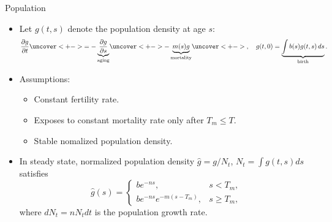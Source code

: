 \documentclass[11pt, aspectratio=169]{beamer}
\begin{document}
\begin{frame}[label=population]{Population}
    \begin{itemize}[<+->]
        \item Let $g(t,s)$ denote the population density at age $s$:
        \begin{equation*}
            \frac{\partial g}{\partial t}
            \uncover<+->{=-\underbrace{\frac{\partial g}{\partial s}}_{\text{aging}}}
            \uncover<+->{-\underbrace{m(s)g}_{\text{mortality}}}
            \uncover<+->{, \quad
            g(t, 0) = \underbrace{\int b(s)g(t,s)\,ds}_{\text{birth}}.}
        \end{equation*}
        \item Assumptions: 
        \begin{itemize}[<+->]
            \item[-] Constant fertility rate. 
            \item[-] Exposes to constant mortality rate only after $T_m\leq T$.
            \item[-] Stable nomalized population density. 
        \end{itemize}
        \item In steady state, normalized population density $\hat{g} = g / N_t$, $N_t = \int g(t, s)ds$ satisfies
        \begin{equation*}
            \hat g(s)=
            \begin{cases}
                be^{-ns}, & s<T_m,\\
                be^{-ns}e^{-m(s-T_m)}, & s\geq T_m,
            \end{cases}
        \end{equation*}
        where $dN_t = nN_tdt$ is the population growth rate.
        \hyperlink{population-density}{%
            }
    \end{itemize}
\end{frame}
\end{document}
